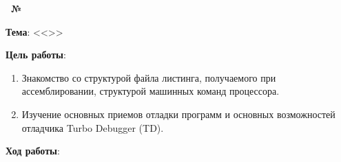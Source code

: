 \begin{center}
   \textbf{\titlePageWorkType~№\titlePageWorkNumber~\titlePageWorkPart}
\end{center}

\textbf{Тема}: <<\titlePageTopic>>

\textbf{Цель работы}: 

\begin{enumerate}
   \item Знакомство со структурой файла листинга, получаемого при ассемблировании, структурой машинных команд процессора.
   \item Изучение основных приемов отладки программ и основных возможностей отладчика Turbo Debugger (TD).
\end{enumerate}

\begin{center}
   \textbf{Ход работы}:
\end{center}




















